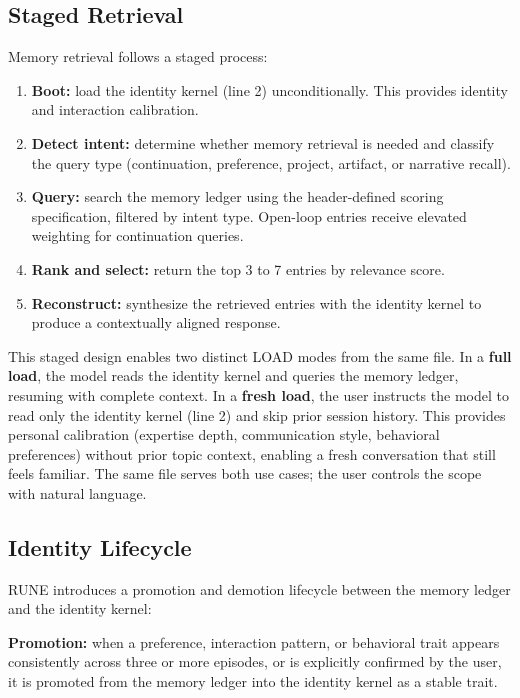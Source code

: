 \documentclass[11pt,a4paper]{article}
\begin{document}
\subsection{Staged Retrieval}

Memory retrieval follows a staged process:

\begin{enumerate}
    \item \textbf{Boot:} load the identity kernel (line 2) unconditionally. This provides identity and interaction calibration.
    \item \textbf{Detect intent:} determine whether memory retrieval is needed and classify the query type (continuation, preference, project, artifact, or narrative recall).
    \item \textbf{Query:} search the memory ledger using the header-defined scoring specification, filtered by intent type. Open-loop entries receive elevated weighting for continuation queries.
    \item \textbf{Rank and select:} return the top 3 to 7 entries by relevance score.
    \item \textbf{Reconstruct:} synthesize the retrieved entries with the identity kernel to produce a contextually aligned response.
\end{enumerate}

This staged design enables two distinct LOAD modes from the same file. In a \textbf{full load}, the model reads the identity kernel and queries the memory ledger, resuming with complete context. In a \textbf{fresh load}, the user instructs the model to read only the identity kernel (line 2) and skip prior session history. This provides personal calibration (expertise depth, communication style, behavioral preferences) without prior topic context, enabling a fresh conversation that still feels familiar. The same file serves both use cases; the user controls the scope with natural language.

\subsection{Identity Lifecycle}

RUNE introduces a promotion and demotion lifecycle between the memory ledger and the identity kernel:

\textbf{Promotion:} when a preference, interaction pattern, or behavioral trait appears consistently across three or more episodes, or is explicitly confirmed by the user, it is promoted from the memory ledger into the identity kernel as a stable trait.
\end{document}
